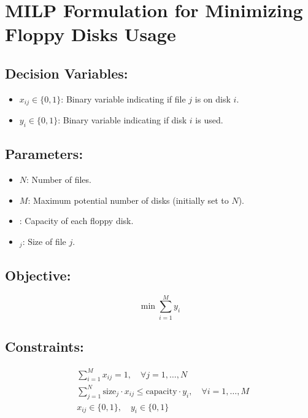 \documentclass{article}
\begin{document}
\section*{MILP Formulation for Minimizing Floppy Disks Usage}

\subsection*{Decision Variables:}
\begin{itemize}
    \item $x_{ij} \in \{0, 1\}$: Binary variable indicating if file $j$ is on disk $i$.
    \item $y_i \in \{0, 1\}$: Binary variable indicating if disk $i$ is used.
\end{itemize}

\subsection*{Parameters:}
\begin{itemize}
    \item $N$: Number of files.
    \item $M$: Maximum potential number of disks (initially set to $N$).
    \item {}: Capacity of each floppy disk.
    \item {}$_j$: Size of file $j$.
\end{itemize}

\subsection*{Objective:}
\begin{equation}
\min \sum_{i=1}^{M} y_i
\end{equation}

\subsection*{Constraints:}
\begin{align}
&\sum_{i=1}^{M} x_{ij} = 1, \quad \forall j = 1, \ldots, N\\
&\sum_{j=1}^{N} \text{size}_j \cdot x_{ij} \leq \text{capacity} \cdot y_i, \quad \forall i = 1, \ldots, M\\
&x_{ij} \in \{0, 1\}, \quad y_i \in \{0, 1\}
\end{align}
\end{document}
